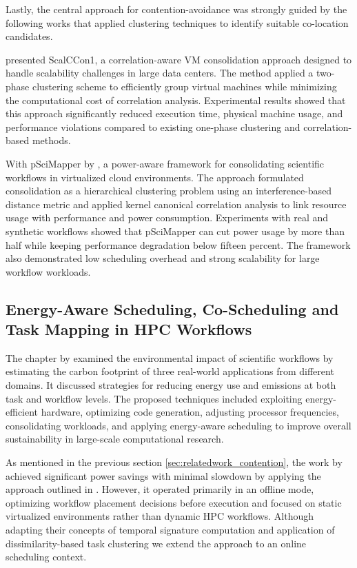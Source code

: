 Lastly, the central approach for contention-avoidance was strongly guided by the following works that applied clustering techniques to identify suitable co-location candidates.

\cite{7237045} presented ScalCCon1, a correlation-aware VM consolidation approach designed to handle scalability challenges in large data centers. The method applied a two-phase clustering scheme to efficiently group virtual machines while minimizing the computational cost of correlation analysis. Experimental results showed that this approach significantly reduced execution time, physical machine usage, and performance violations compared to existing one-phase clustering and correlation-based methods.

With pSciMapper by \cite{5644899}, a power-aware framework for consolidating scientific workflows in virtualized cloud environments. The approach formulated consolidation as a hierarchical clustering problem using an interference-based distance metric and applied kernel canonical correlation analysis to link resource usage with performance and power consumption. Experiments with real and synthetic workflows showed that pSciMapper can cut power usage by more than half while keeping performance degradation below fifteen percent. The framework also demonstrated low scheduling overhead and strong scalability for large workflow workloads.

\subsection{Energy-Aware Scheduling, Co-Scheduling and Task Mapping in HPC Workflows}
\label{sec:relatedwork_scheduling}

The chapter by \cite{thamsen2025energyawareworkflowexecutionoverview} examined the environmental impact of scientific workflows by estimating the carbon footprint of three real-world applications from different domains. It discussed strategies for reducing energy use and emissions at both task and workflow levels. The proposed techniques included exploiting energy-efficient hardware, optimizing code generation, adjusting processor frequencies, consolidating workloads, and applying energy-aware scheduling to improve overall sustainability in large-scale computational research.

As mentioned in the previous section \ref{sec:relatedwork_contention}, the work by \cite{5644899} achieved significant power savings with minimal slowdown by applying the approach outlined in \cite{thamsen2025energyawareworkflowexecutionoverview}. However, it operated primarily in an offline mode, optimizing workflow placement decisions before execution and focused on static virtualized environments rather than dynamic HPC workflows. Although adapting their concepts of temporal signature computation and application of dissimilarity-based task clustering we extend the approach to an online scheduling context.

